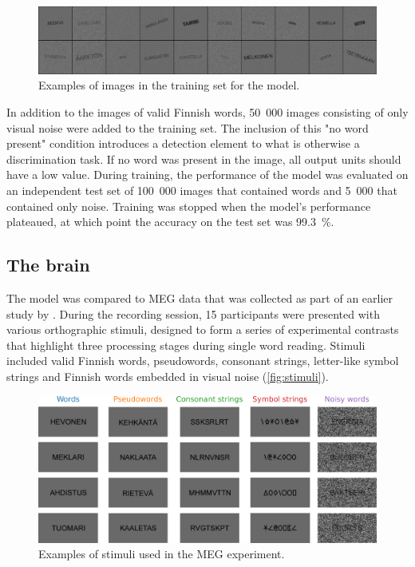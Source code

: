 \documentclass[a4paper, 10pt]{vanvliet_paper}
\begin{document}
\begin{figure}
    \includegraphics[width=\textwidth]{train.png}
    \caption{Examples of images in the training set for the model.}\label{fig:train}
\end{figure}

In addition to the images of valid Finnish words, 50~000 images consisting of only visual noise were added to the training set.
The inclusion of this "no word present" condition introduces a detection element to what is otherwise a discrimination task.
If no word was present in the image, all output units should have a low value.
During training, the performance of the model was evaluated on an independent test set of 100~000 images that contained words and 5~000 that contained only noise.
Training was stopped when the model's performance plateaued, at which point the accuracy on the test set was \SI{99.3}{\percent}.

\subsection{The brain}

The model was compared to \gls{MEG} data that was collected as part of an earlier study by \textcite{Vartiainen2011}.
During the recording session, 15 participants were presented with various orthographic stimuli, designed to form a series of experimental contrasts that highlight three processing stages during single word reading.
Stimuli included valid Finnish words, pseudowords, consonant strings, letter-like symbol strings and Finnish words embedded in visual noise (\autoref{fig:stimuli}).

\begin{figure}
    \includegraphics[width=\textwidth]{stimuli.pdf}
    \caption{Examples of stimuli used in the \gls{MEG} experiment.}\label{fig:stimuli}
\end{figure}
\end{document}
